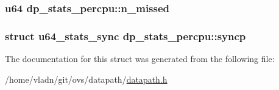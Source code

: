 \subsubsection[{n\+\_\+missed}]{\setlength{\rightskip}{0pt plus 5cm}u64 dp\+\_\+stats\+\_\+percpu\+::n\+\_\+missed}\label{structdp__stats__percpu_ab919c22c9548a3dcd42632fb84634e26}
\hypertarget{structdp__stats__percpu_ad67971f59f6db5432848db23d185dc2f}{}
\subsubsection[{syncp}]{\setlength{\rightskip}{0pt plus 5cm}struct {\bf u64\+\_\+stats\+\_\+sync} dp\+\_\+stats\+\_\+percpu\+::syncp}\label{structdp__stats__percpu_ad67971f59f6db5432848db23d185dc2f}


The documentation for this struct was generated from the following file\+:\begin{DoxyCompactItemize}
\item 
/home/vladn/git/ovs/datapath/\hyperlink{datapath_8h}{datapath.\+h}\end{DoxyCompactItemize}
